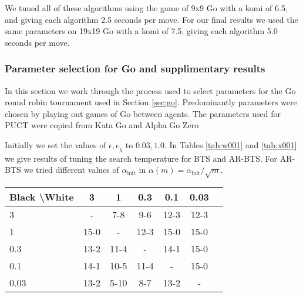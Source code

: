    We tuned all of these algorithms using the game of 9x9 Go with a komi of 6.5, and giving each algorithm 2.5 seconds per move. For our final results we used the same parameters on 19x19 Go with a komi of 7.5, giving each algorithm 5.0 seconds per move.






\subsubsection{Parameter selection for Go and supplimentary results} \label{app:go_hps}

    In this section we work through the process used to select parameters for the Go round robin tournament used in Section \ref{sec:go}. Predominantly parameters were chosen by playing out games of Go between agents. The parameters used for PUCT were copied from Kata Go and Alpha Go Zero  %
    
    Initially we set the values of $\epsilon,\epsilon_{\tilde{\lambda}}$ to $0.03,1.0$. In Tables \ref{tab:w001} and \ref{tab:x001} we give results of tuning the search temperature for BTS and AR-BTS. For AR-BTS we tried different values of $\alpha_{\text{init}}$ in $\alpha(m)=\alpha_{\text{init}}/\sqrt{m}$.
    
    \begin{table*}[]
    \centering
        \begin{tabular}{l|cccccc}
            \textbf{Black \textbackslash White}     & 3  & 1   & 0.3   & 0.1    & 0.03    \\ 
            \hline
                                    3            & -     	& 7-8  		& 9-6  		&  12-3 		& 12-3  		\\
                                    1            & 15-0 & - & 12-3 & 15-0 & 15-0   		\\
                                    0.3          & 13-2 & 11-4 & - & 14-1 & 15-0  		\\
                                    0.1          & 14-1 & 10-5 & 11-4 & - & 15-0   		\\
                                    0.03         & 13-2 & 5-10 & 8-7 & 13-2 &   -   	\\    
        \end{tabular}
        \caption{Results for round robin to select the temperature parameter $\alpha$ for BTS. The value of 1.0 won all four of its matches so was selected. \label{tab:w001}}
    \end{table*}
    
